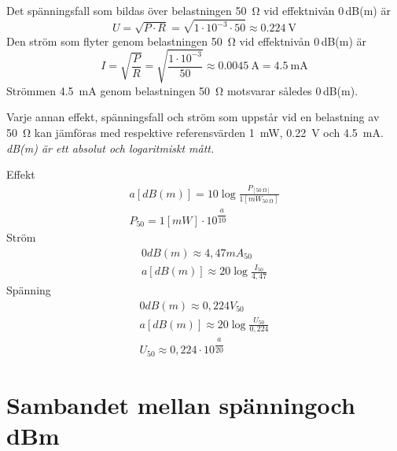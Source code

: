 Det spänningsfall som bildas över belastningen \SI{50}{\ohm} vid effektnivån
0\,dB(m) är
\[U = \sqrt{P\cdot R} = \sqrt{1\cdot 10^{-3} \cdot 50} \approx \SI{0,224}{\volt}\]
Den ström som flyter genom belastningen \SI{50}{\ohm} vid effektnivån 0\,dB(m)
är
\[
I = \sqrt{\frac{P}{R}} = \sqrt{\frac{1\cdot 10^{-3}}{50}} \approx \SI{0,0045}{\ampere} = \SI{4,5}{\milli\ampere}
\]
Strömmen \SI{4,5}{\milli\ampere} genom belastningen \SI{50}{\ohm} motsvarar
således 0\,dB(m).

Varje annan effekt, spänningsfall och ström som uppstår vid en belastning av
\SI{50}{\ohm} kan jämföras med respektive referensvärden \SI{1}{\milli\watt},
\SI{0,22}{\volt} och \SI{4,5}{\milli\ampere}.
\emph{dB(m) är ett absolut och logaritmiskt mått.}

\vspace*{1ex}
\noindent
Effekt
\begin{gather*}
	a [dB(m)] = 10 \log\frac{P_{[\SI{50}{\ohm}]}}{1[mW_{\SI{50}{\ohm}}]} \\
	P_{50} = 1 [mW] \cdot 10^{\dfrac{a}{10}}
\end{gather*}
Ström
\begin{gather*}
	0 dB(m) \approx 4,47 mA_{50} \\
	a [dB(m)] \approx 20 \log\frac{I_{50}}{4,47}
\end{gather*}
Spänning
\begin{gather*}
	0 dB(m) \approx 0,224 V_{50} \\
	a [dB(m)] \approx 20 \log\frac{U_{50}}{0,224} \\
	U_{50} \approx 0,224 \cdot 10^{\dfrac{a}{20}}
\end{gather*}

\section[Sambandet spänning och dBm]{Sambandet mellan spänning\newline och dBm}

